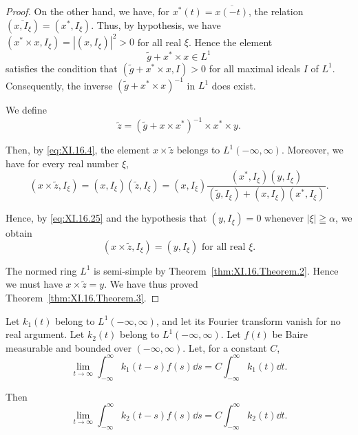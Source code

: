 \begin{proof}
On the other hand, we have, for $x^{*}(t) = \overline{x(-t)}$, the relation $(\overline{x,I_{\xi}}) = (x^{*},I_{\xi})$. Thus, by hypothesis, we have $(x^{*}\times x,I_{\xi}) = |(x,I_{\xi})|^2 > 0$ for all real $\xi$. Hence the element 
\[
\tilde {g} + x ^{*} \times x \in L ^{1}
\]
satisfies the condition that $(\tilde{g} + x^{*}\times x, I) > 0$ for all maximal ideals $I$ of $L^1$. Consequently, the inverse $(\tilde{g} + x^{*}\times x)^{-1}$ in $L^1$ does exist. 

We define 
\begin{equation}\label{eq:XI.16.26}
\tilde {z} = (\tilde {g} + x \times x ^{*}) ^{-1} \times x ^{*} \times y.
\end{equation}

Then, by \eqref{eq:XI.16.4}, the element $x \times \tilde{z}$ belongs to $L^1(-\infty, \infty)$. Moreover, we have for every real number $\xi$, 
\[
(x \times \tilde {z}, I _{\xi}) = (x, I _{\xi}) (\tilde {z}, I _{\xi}) = (x, I _{\xi}) \frac {(x ^{*} , I _{\xi}) (y , I _{\xi})}{(\tilde {g} , I _{\xi}) + (x , I _{\xi}) (x ^{*} , I _{\xi})}.
\]

Hence, by \eqref{eq:XI.16.25} and the hypothesis that $(y, I_{\xi}) = 0$ whenever $|\xi| \geqq \alpha$, we obtain 
\[
(x \times \tilde {z}, I _{\xi}) = (y, I _{\xi}) \text{ for all real } \xi .
\]

The normed ring $L^1$ is semi-simple by Theorem~\ref{thm:XI.16.Theorem.2}. Hence we must have $x \times \tilde{z} = y$. We have thus proved Theorem~\ref{thm:XI.16.Theorem.3}.
\end{proof}

\begin{corollaryu} Let $k_{1}(t)$ belong to $L^{1}(-\infty, \infty)$, and let its Fourier transform vanish for no real argument. Let $k_{2}(t)$ belong to $L^{1}(-\infty, \infty)$. Let $f(t)$ be Baire measurable and bounded over $(-\infty, \infty)$. Let, for a constant $C$, 
\begin{equation}\label{eq:XI.16.27}
\lim\limits _{t \rightarrow \infty} \int_{- \infty} ^{\infty} k _{1} (t - s) f (s) \dd s = C \int_{- \infty} ^{\infty} k _{1} (t) \dd t.
\end{equation}
\end{corollaryu}

Then 
\begin{equation}\label{eq:XI.16.28}
\lim\limits _{t \rightarrow \infty} \int_{- \infty} ^{\infty} k _{2} (t - s) f (s) \dd s = C \int_{- \infty} ^{\infty} k _{2} (t) \dd t.
\end{equation}

